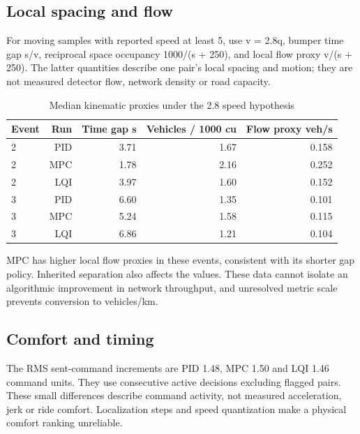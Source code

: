 \documentclass[11pt,a4paper]{article}
\begin{document}
\subsection*{Local spacing and flow}

For moving samples with reported speed at least 5, use v = 2.8q, bumper time gap s/v, reciprocal space occupancy 1000/(s + 250), and local flow proxy v/(s + 250). The latter quantities describe one pair's local spacing and motion; they are not measured detector flow, network density or road capacity.


\begin{table}[H]\centering\small\caption{Median kinematic proxies under the 2.8 speed hypothesis}
\begin{tabular}{lrrrr}
\toprule
Event & Run & Time gap s & Vehicles / 1000 cu & Flow proxy veh/s \\
\midrule

2 & PID & 3.71 & 1.67 & 0.158 \\

2 & MPC & 1.78 & 2.16 & 0.252 \\

2 & LQI & 3.97 & 1.60 & 0.152 \\

3 & PID & 6.60 & 1.35 & 0.101 \\

3 & MPC & 5.24 & 1.58 & 0.115 \\

3 & LQI & 6.86 & 1.21 & 0.104 \\

\bottomrule\end{tabular}\end{table}

MPC has higher local flow proxies in these events, consistent with its shorter gap policy. Inherited separation also affects the values. These data cannot isolate an algorithmic improvement in network throughput, and unresolved metric scale prevents conversion to vehicles/km.


\subsection*{Comfort and timing}

The RMS sent-command increments are PID 1.48, MPC 1.50 and LQI 1.46 command units. They use consecutive active decisions excluding flagged pairs. These small differences describe command activity, not measured acceleration, jerk or ride comfort. Localization steps and speed quantization make a physical comfort ranking unreliable.
\end{document}
